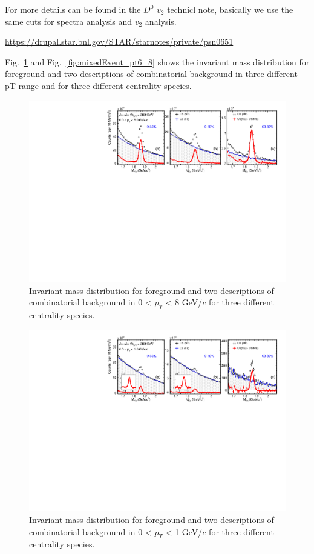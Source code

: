 For more details can be found in the $D^0$ $v_2$ technicl note, basically we use the same cuts for spectra analysis and $v_2$ analysis.

\url{https://drupal.star.bnl.gov/STAR/starnotes/private/psn0651}

Fig.~\ref{fig:mixedEvent_pt0_8} and Fig.~\ref{fig:mixedEvent_pt6_8} shows the invariant mass distribution for foreground and two descriptions of combinatorial background in three different pT range and for three different centrality species.

\begin{figure}[htbp]
\centering
\includegraphics[keepaspectratio,width=1.0\textwidth]{figure/Run14_D0HFT/signal_0_8GeV.pdf}
\caption{Invariant mass distribution for foreground and two descriptions of combinatorial background in 0 < $p_T$ < 8 GeV/$c$ for three different centrality species.}
\label{fig:mixedEvent_pt0_8}
\end{figure}

\begin{figure}[htbp]
\centering
\includegraphics[keepaspectratio,width=1.0\textwidth]{figure/Run14_D0HFT/signal2_0_1GeV.pdf}
\caption{Invariant mass distribution for foreground and two descriptions of combinatorial background in 0 < $p_T$ < 1 GeV/$c$ for three different centrality species.}
\label{fig:mixedEvent_pt0_1}
\end{figure}

